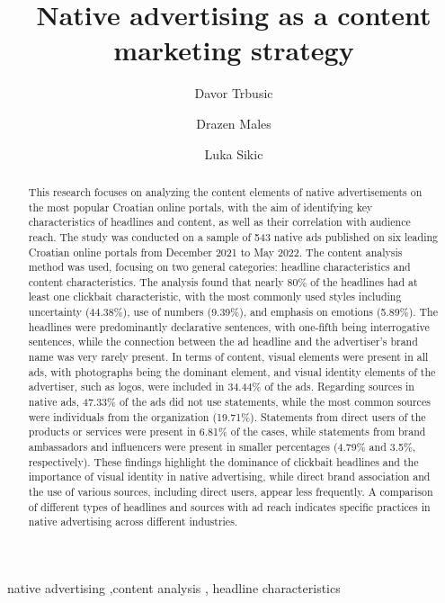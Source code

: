 \documentclass[preprint, 3p,
authoryear]{elsarticle} %
\begin{document}
\begin{frontmatter}

  \title{Native advertising as a content marketing strategy}
    \author[Croatian Catholic University]{Davor Trbusic%
  }
    \author[Faculty of Croatian Studies]{Drazen Males%
  }
    \author[Croatian Catholic University]{Luka Sikic%
  }
  
  \begin{abstract}
  This research focuses on analyzing the content elements of native
  advertisements on the most popular Croatian online portals, with the
  aim of identifying key characteristics of headlines and content, as
  well as their correlation with audience reach. The study was conducted
  on a sample of 543 native ads published on six leading Croatian online
  portals from December 2021 to May 2022. The content analysis method
  was used, focusing on two general categories: headline characteristics
  and content characteristics. The analysis found that nearly 80\% of
  the headlines had at least one clickbait characteristic, with the most
  commonly used styles including uncertainty (44.38\%), use of numbers
  (9.39\%), and emphasis on emotions (5.89\%). The headlines were
  predominantly declarative sentences, with one-fifth being
  interrogative sentences, while the connection between the ad headline
  and the advertiser's brand name was very rarely present. In terms of
  content, visual elements were present in all ads, with photographs
  being the dominant element, and visual identity elements of the
  advertiser, such as logos, were included in 34.44\% of the ads.
  Regarding sources in native ads, 47.33\% of the ads did not use
  statements, while the most common sources were individuals from the
  organization (19.71\%). Statements from direct users of the products
  or services were present in 6.81\% of the cases, while statements from
  brand ambassadors and influencers were present in smaller percentages
  (4.79\% and 3.5\%, respectively). These findings highlight the
  dominance of clickbait headlines and the importance of visual identity
  in native advertising, while direct brand association and the use of
  various sources, including direct users, appear less frequently. A
  comparison of different types of headlines and sources with ad reach
  indicates specific practices in native advertising across different
  industries.
  \end{abstract}
    \begin{keyword}
    native advertising \sep content analysis \sep 
    headline characteristics
  \end{keyword}
  

\end{frontmatter}
\end{document}
